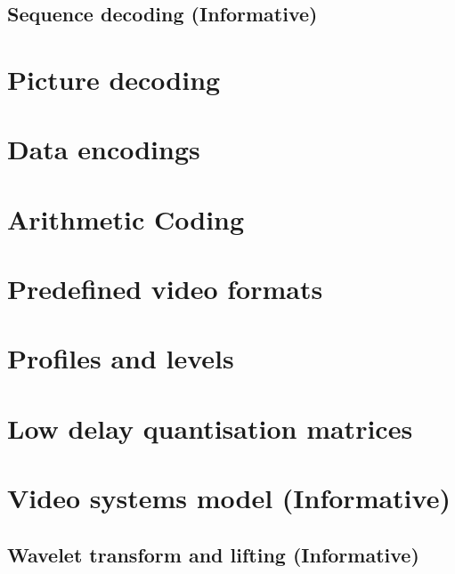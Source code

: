 \clearpage
\begin{informative*}
\section{Sequence decoding (Informative)}
\end{informative*}
\clearpage
\section{Picture decoding}





\clearpage

\appendix
\section{Data encodings}

\clearpage
\section{Arithmetic Coding}

\clearpage
\section{Predefined video formats}

\clearpage
\section{Profiles and levels}

\clearpage
\section{Low delay quantisation matrices}


\clearpage
\section{Video systems model (Informative)}


\clearpage
\begin{informative*}
\section{Wavelet transform and lifting (Informative)}

\end{informative*}



